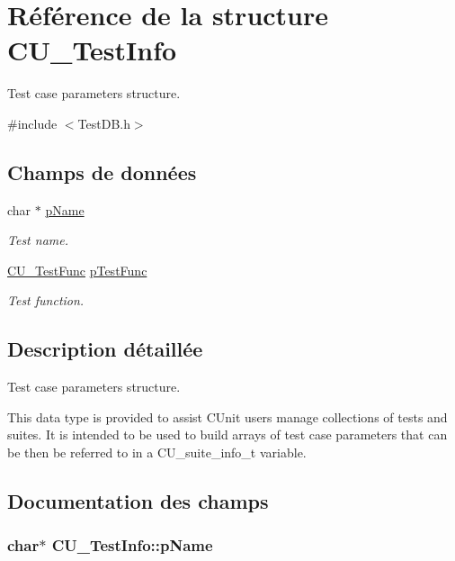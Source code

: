 \hypertarget{structCU__TestInfo}{\section{Référence de la structure C\-U\-\_\-\-Test\-Info}
\label{structCU__TestInfo}
}


Test case parameters structure.  




{\ttfamily \#include $<$Test\-D\-B.\-h$>$}

\subsection*{Champs de données}
\begin{DoxyCompactItemize}
\item 
char $\ast$ \hyperlink{structCU__TestInfo_a9b79e7b8c366a6076bb0ba2cd066c222}{p\-Name}
\begin{DoxyCompactList}\small\item\em Test name. \end{DoxyCompactList}\item 
\hyperlink{group__Framework_ga5868148b642b30635b8fe7f095c5b493}{C\-U\-\_\-\-Test\-Func} \hyperlink{structCU__TestInfo_a8b01dd299cfa2ba6b972fea808e7b007}{p\-Test\-Func}
\begin{DoxyCompactList}\small\item\em Test function. \end{DoxyCompactList}\end{DoxyCompactItemize}


\subsection{Description détaillée}
Test case parameters structure. 

This data type is provided to assist C\-Unit users manage collections of tests and suites. It is intended to be used to build arrays of test case parameters that can be then be referred to in a C\-U\-\_\-suite\-\_\-info\-\_\-t variable. 

\subsection{Documentation des champs}
\hypertarget{structCU__TestInfo_a9b79e7b8c366a6076bb0ba2cd066c222}{
\subsubsection[{p\-Name}]{\setlength{\rightskip}{0pt plus 5cm}char$\ast$ C\-U\-\_\-\-Test\-Info\-::p\-Name}}\label{structCU__TestInfo_a9b79e7b8c366a6076bb0ba2cd066c222}


